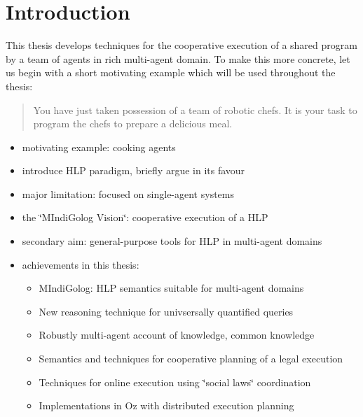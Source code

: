 \chapter{Introduction} %


This thesis develops techniques for the cooperative execution of a
shared program by a team of agents in rich multi-agent domain. To
make this more concrete, let us begin with a short motivating example
which will be used throughout the thesis:

\begin{quote}
You have just taken possession of a team of robotic chefs. It is your
task to program the chefs to prepare a delicious meal. 
\end{quote}
\begin{itemize}
\item motivating example: cooking agents 
\item introduce HLP paradigm, briefly argue in its favour 
\item major limitation: focused on single-agent systems 
\item the \char`\"{}MIndiGolog Vision\char`\"{}: cooperative execution of
a HLP 
\item secondary aim: general-purpose tools for HLP in multi-agent domains 
\item achievements in this thesis: 

\begin{itemize}
\item MIndiGolog: HLP semantics suitable for multi-agent domains 
\item New reasoning technique for univsersally quantified queries 
\item Robustly multi-agent account of knowledge, common knowledge 
\item Semantics and techniques for cooperative planning of a legal execution 
\item Techniques for online execution using \char`\"{}social laws\char`\"{}
coordination 
\item Implementations in Oz with distributed execution planning 
\end{itemize}
\end{itemize}

